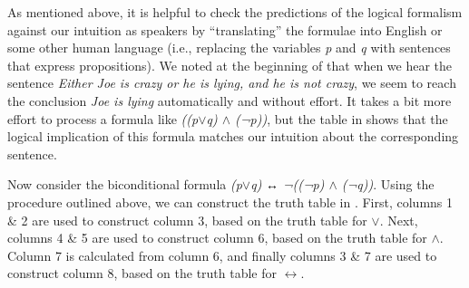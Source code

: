 As mentioned above, it is helpful to check the predictions of the logical formalism against our intuition as speakers by “translating” the formulae into English or some other human language (i.e., replacing the variables \textit{p} and \textit{q} with sentences that express propositions). We noted at the beginning of  that when we hear the sentence \textit{Either Joe is crazy or he is lying, and he is not crazy}, we seem to reach the conclusion \textit{Joe is lying} automatically and without effort. It takes a bit more effort to process a formula like \textit{((p$\vee$q) $\wedge$ (¬p))}, but the table in  shows that the logical implication of this formula matches our intuition about the corresponding sentence.

Now consider the biconditional formula \textit{(p$\vee$q)} ↔ \textit{¬((¬p) $\wedge$ (¬q))}. Using the procedure outlined above, we can construct the truth table in . First, columns 1 \& 2 are used to construct column 3, based on the truth table for \textit{$\vee$}. Next, columns 4 \& 5 are used to construct column 6, based on the truth table for \textit{$\wedge$}. Column 7 is calculated from column 6, and finally columns 3 \& 7 are used to construct column 8, based on the truth table for \textit{$\leftrightarrow $}.



